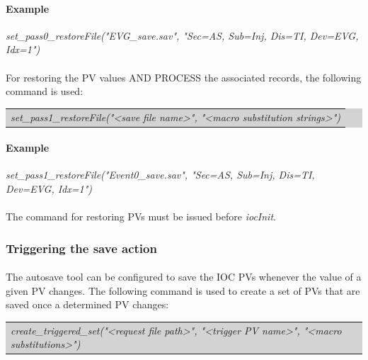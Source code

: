 \documentclass[openany]{article}
\begin{document}
			\paragraph{Example} \emph{set\_pass0\_restoreFile("EVG\_save.sav", "Sec=AS, Sub=Inj, Dis=TI, Dev=EVG, Idx=1")}

			\paragraph{} For restoring the PV values AND PROCESS the associated records, the following command is used:

			\bigskip
			\colorbox{lightgray}{
				\begin{tabularx}{0.9\textwidth}{X}
				\emph{set\_pass1\_restoreFile("\textless save file name\textgreater", "\textless macro substitution strings\textgreater")}
				\end{tabularx}
			}

			\paragraph{Example} \emph{set\_pass1\_restoreFile("Event0\_save.sav", "Sec=AS, Sub=Inj, Dis=TI, Dev=EVG, Idx=1")}

			\paragraph{} {\color{red}The command for restoring PVs must be issued before \emph{iocInit}.}

		\subsubsection{Triggering the save action}

			\paragraph{} The autosave tool can be configured to save the IOC PVs whenever the value of a given PV changes. The following command is used to create a set of PVs that are saved once a determined PV changes:

			\bigskip
			\colorbox{lightgray}{
				\begin{tabularx}{0.9\textwidth}{X}
				\emph{create\_triggered\_set("\textless request file path\textgreater", "\textless trigger PV name\textgreater", "\textless macro substitutions\textgreater")}
				\end{tabularx}
			}
\end{document}
